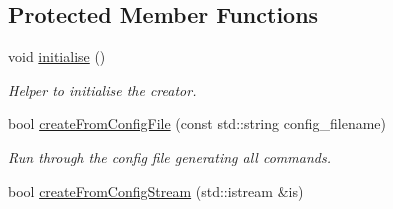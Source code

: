\subsection*{\-Protected \-Member \-Functions}
\begin{DoxyCompactItemize}
\item 
void \hyperlink{classcryomesh_1_1manager_1_1Creator_a1cf96043a609df452620aba02370dd46}{initialise} ()
\begin{DoxyCompactList}\small\item\em \-Helper to initialise the creator. \end{DoxyCompactList}\item 
bool \hyperlink{classcryomesh_1_1manager_1_1Creator_ac25b12d7fcd727c0228e551732605e10}{create\-From\-Config\-File} (const std\-::string config\-\_\-filename)
\begin{DoxyCompactList}\small\item\em \-Run through the config file generating all commands. \end{DoxyCompactList}\item 
bool \hyperlink{classcryomesh_1_1manager_1_1Creator_ab816409b411aed0ceb2abe38afb8fef9}{create\-From\-Config\-Stream} (std\-::istream \&is)
\end{DoxyCompactItemize}
